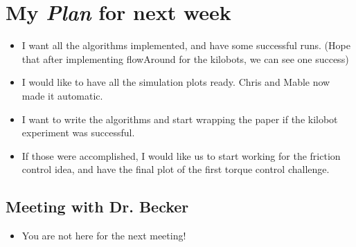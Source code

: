 \section{My \emph{Plan} for next week}

\begin{itemize}
\item I want all the algorithms implemented, and have some successful runs. (Hope that after implementing flowAround for the kilobots, we can see one success)
\item I would like to have all the simulation plots ready. Chris and Mable now made it automatic.
\item I want to write the algorithms and start wrapping the paper if the kilobot experiment was successful.
\item If those were accomplished, I would like us to start working for the friction control idea, and have the final plot of the first torque control challenge.
\end{itemize}

\subsection{Meeting with Dr. Becker  }

\begin{itemize}
\item You are not here for the next meeting!
\end{itemize}


